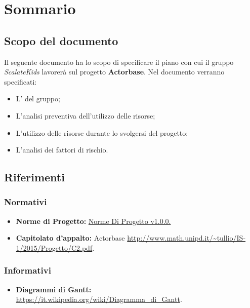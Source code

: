 \documentclass{scalatekids-article}
\begin{document}
\section{Sommario}
\subsection{Scopo del documento}
Il seguente documento ha lo scopo di specificare il piano con cui il gruppo \textit{ScalateKids} lavorerà sul progetto \textbf{Actorbase}.
Nel documento verranno specificati:
\begin{itemize}
\item {L' del gruppo;}
\item {L'analisi preventiva dell'utilizzo delle risorse;}
\item {L'utilizzo delle risorse durante lo svolgersi del progetto;}
\item {L'analisi dei fattori di rischio.}
\end{itemize}
\prodPurpose
\glossExpl
\subsection{Riferimenti}
\subsubsection{Normativi}
\begin{itemize}
\item \textbf{Norme di Progetto:} \href{run:../Interni/NormeDiProgetto\_v1.0.0.pdf}{Norme Di Progetto v1.0.0.}
\item \textbf{Capitolato d'appalto:} Actorbase \url{http://www.math.unipd.it/~tullio/IS-1/2015/Progetto/C2.pdf}.
\end{itemize}
\subsubsection{Informativi}
\begin{itemize}
\item \textbf{Diagrammi di Gantt:} \url{https://it.wikipedia.org/wiki/Diagramma_di_Gantt}.
\end{itemize}
\end{document}
